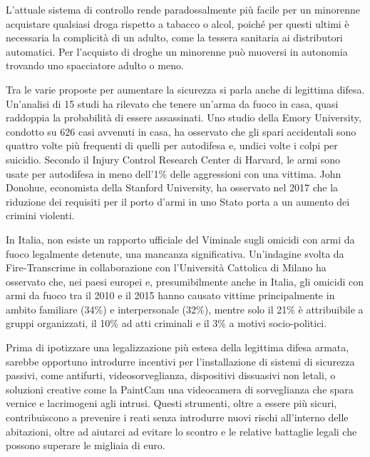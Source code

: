 \documentclass[12pt]{book} %
\begin{document}
L'attuale sistema di controllo rende paradossalmente più facile per un minorenne acquistare qualsiasi droga rispetto a tabacco o alcol, poiché per questi ultimi è necessaria la complicità di un adulto, come la tessera sanitaria ai distributori automatici. Per l'acquisto di droghe un minorenne può muoversi in autonomia trovando uno spacciatore adulto o meno.

Tra le varie proposte per aumentare la sicurezza si parla anche di legittima difesa.
Un'analisi di 15 studi ha rilevato che tenere un'arma da fuoco in casa, quasi raddoppia la probabilità di essere assassinati. Uno studio della Emory University, condotto su 626 casi avvenuti in casa, ha osservato che gli spari accidentali sono quattro volte più frequenti di quelli per autodifesa e, undici volte i colpi per suicidio. Secondo il Injury Control Research Center di Harvard, le armi sono usate per autodifesa in meno dell'1\% delle aggressioni con una vittima. John Donohue, economista della Stanford University, ha osservato nel 2017 che la riduzione dei requisiti per il porto d'armi in uno Stato porta a un aumento dei crimini violenti.

In Italia, non esiste un rapporto ufficiale del Viminale sugli omicidi con armi da fuoco legalmente detenute, una mancanza significativa. Un’indagine svolta da Fire-Transcrime in collaborazione con l'Università Cattolica di Milano ha osservato che, nei paesi europei e, presumibilmente anche in Italia, gli omicidi con armi da fuoco tra il 2010 e il 2015 hanno causato vittime principalmente in ambito familiare (34\%) e interpersonale (32\%), mentre solo il 21\% è attribuibile a gruppi organizzati, il 10\% ad atti criminali e il 3\% a motivi socio-politici.

Prima di ipotizzare una legalizzazione più estesa della legittima difesa armata, sarebbe opportuno introdurre incentivi per l'installazione di sistemi di sicurezza passivi, come antifurti, videosorveglianza, dispositivi dissuasivi non letali, o soluzioni creative come la PaintCam una videocamera di sorveglianza che spara vernice e lacrimogeni agli intrusi. Questi strumenti, oltre a essere più sicuri, contribuiscono a prevenire i reati senza introdurre nuovi rischi all'interno delle abitazioni, oltre ad aiutarci ad evitare lo scontro e le relative battaglie legali che possono superare le migliaia di euro.
\end{document}
